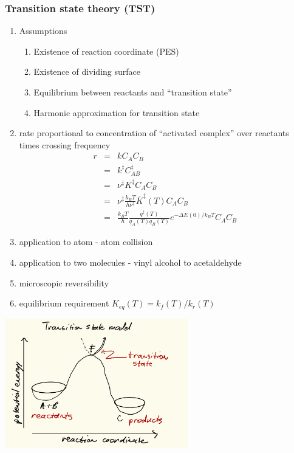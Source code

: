 \documentclass[11pt]{article}
\begin{document}
\subsubsection{Transition state theory (TST)}
\label{sec:org85d2558}
\begin{enumerate}
\item Assumptions
\begin{enumerate}
\item Existence of reaction coordinate (PES)
\item Existence of dividing surface
\item Equilibrium between reactants and ``transition state''
\item Harmonic approximation for transition state
\end{enumerate}
\item rate proportional to concentration of ``activated complex'' over reactants times crossing frequency
\begin{eqnarray*}
   r & = & k C_AC_B \\
     & = & k^\ddagger C_{AB}^\ddagger \\
     & = & \nu^\ddagger K^\ddagger C_A C_ B \\
     & = & \nu^\ddagger \frac{k_BT}{h\nu^\ddagger}\bar{K}^\ddagger(T) C_A C_B \\
     & = & \frac{k_B T}{h} \frac{q^\ddagger(T)}{q_A(T) q_B(T)}  e^{-{\Delta E(0)/k_BT}} C_A C_B
\end{eqnarray*}
\item application to atom - atom collision
\item application to two molecules - vinyl alcohol to acetaldehyde
\item microscopic reversibility
\item equilibrium requirement \(K_{eq}(T) = k_f(T)/k_r(T)\)
\end{enumerate}

\begin{center}
\includegraphics[width=0.6\textwidth]{./Images/PES.png}
\end{center}
\end{document}
